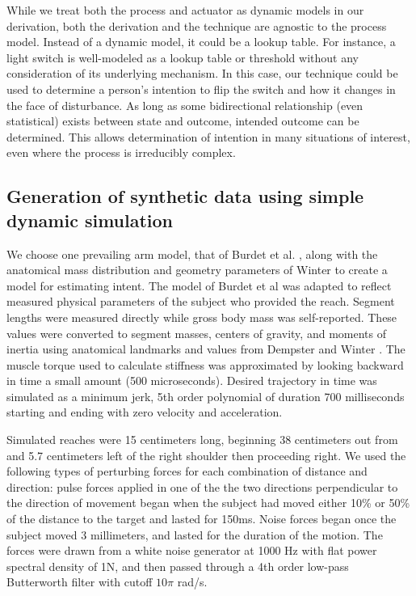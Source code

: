 \documentclass[10pt]{article}
\begin{document}
While we treat both the process and actuator as dynamic models in our derivation, both the derivation and the technique are agnostic to the process model. Instead of a dynamic model, it could be a lookup table. For instance, a light switch is well-modeled as a lookup table or threshold without any consideration of its underlying mechanism. In this case, our technique could be used to determine a person's intention to flip the switch and how it changes in the face of disturbance. As long as some bidirectional relationship (even statistical) exists between state and outcome, intended outcome can be determined. This allows determination of intention in many situations of interest, even where the process is irreducibly complex.

\subsection*{Generation of synthetic data using simple dynamic simulation}
We choose one prevailing arm model, that of Burdet et al. \cite{burdet2006stability}, along with the anatomical mass distribution and geometry parameters of Winter \cite{winter2009biomechanics} to create a model for estimating intent. The model of Burdet et al \cite{burdet2006stability} was adapted to reflect measured physical parameters of the subject who provided the reach. Segment lengths were measured directly while gross body mass was self-reported. These values were converted to segment masses, centers of gravity, and moments of inertia using anatomical landmarks and values from Dempster \cite{dempster1955space} and Winter \cite{winter2009biomechanics}. The muscle torque used to calculate stiffness was approximated by looking backward in time a small amount (500 microseconds). Desired trajectory in time was simulated as a minimum jerk, 5th order polynomial of duration 700 milliseconds starting and ending with zero velocity and acceleration.

Simulated reaches were 15 centimeters long, beginning 38 centimeters out from and 5.7 centimeters left of the right shoulder then proceeding right.  We used the following types of perturbing forces for each combination of distance and direction: 
pulse forces applied in one of the the two directions perpendicular to the direction of movement began when the subject had moved either 10\% or 50\% of the distance to the target and lasted for 150ms.
Noise forces began once the subject moved 3 millimeters, and lasted for the duration of the motion. The forces were drawn from a white noise generator at 1000 Hz with flat power spectral density of 1N, and then passed through a 4th order low-pass Butterworth filter with cutoff $10\pi$ rad/s. 
\end{document}
